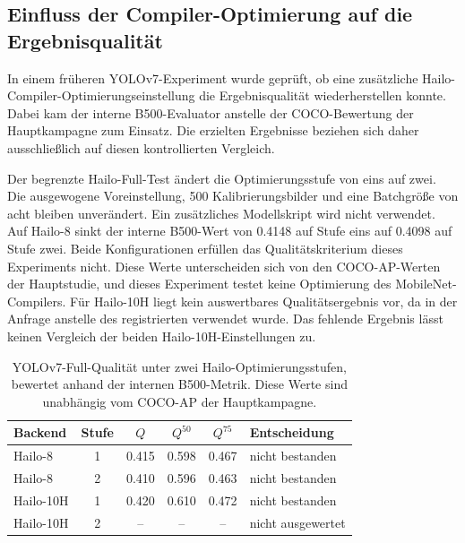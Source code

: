 

\subsection{Einfluss der Compiler-Optimierung auf die Ergebnisqualität}
\label{app:split_development_details}

In einem früheren YOLOv7-Experiment wurde geprüft, ob eine zusätzliche Hailo-Compiler-Optimierungseinstellung die Ergebnisqualität wiederherstellen konnte. Dabei kam der interne B500-Evaluator anstelle der COCO-Bewertung der Hauptkampagne zum Einsatz. Die erzielten Ergebnisse beziehen sich daher ausschließlich auf diesen kontrollierten Vergleich.

Der begrenzte Hailo-Full-Test ändert die Optimierungsstufe von eins auf zwei. Die ausgewogene Voreinstellung, 500 Kalibrierungsbilder und eine Batchgröße von acht bleiben unverändert. Ein zusätzliches Modellskript wird nicht verwendet. Auf Hailo-8 sinkt der interne B500-Wert von \num{0.4148} auf Stufe eins auf \num{0.4098} auf Stufe zwei. Beide Konfigurationen erfüllen das Qualitätskriterium dieses Experiments nicht. Diese Werte unterscheiden sich von den COCO-AP-Werten der Hauptstudie, und dieses Experiment testet keine Optimierung des MobileNet-Compilers. Für Hailo-10H liegt kein auswertbares Qualitätsergebnis vor, da in der Anfrage  anstelle des registrierten  verwendet wurde. Das fehlende Ergebnis lässt keinen Vergleich der beiden Hailo-10H-Einstellungen zu.

\begin{table}[H]
\centering\small\TableSetup
\caption{YOLOv7-Full-Qualität unter zwei Hailo-Optimierungsstufen, bewertet anhand der internen B500-Metrik. Diese Werte sind unabhängig vom COCO-AP der Hauptkampagne.}
\label{tab:evaluation:yolov7_opt_sensitivity}
\begin{tabular}{@{}l c S[table-format=1.3] S[table-format=1.3] S[table-format=1.3] l@{}}
\toprule
Backend & Stufe & {$Q$} & {$Q^{50}$} & {$Q^{75}$} & Entscheidung \\
\midrule
Hailo-8 & 1 & 0.415 & 0.598 & 0.467 & nicht bestanden \\
Hailo-8 & 2 & 0.410 & 0.596 & 0.463 & nicht bestanden \\
Hailo-10H & 1 & 0.420 & 0.610 & 0.472 & nicht bestanden \\
Hailo-10H & 2 & {--} & {--} & {--} & nicht ausgewertet \\
\bottomrule
\end{tabular}
\end{table}

